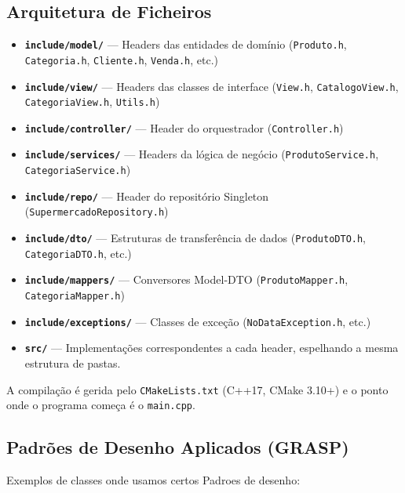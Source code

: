 \documentclass[a4paper]{llncs}
\begin{document}
\subsection{Arquitetura de Ficheiros}

\begin{itemize}
    \item \textbf{\texttt{include/model/}} — Headers das entidades de domínio (\texttt{Produto.h}, \texttt{Categoria.h}, \texttt{Cliente.h}, \texttt{Venda.h}, etc.)
    \item \textbf{\texttt{include/view/}} — Headers das classes de interface (\texttt{View.h}, \texttt{CatalogoView.h}, \texttt{CategoriaView.h}, \texttt{Utils.h})
    \item \textbf{\texttt{include/controller/}} — Header do orquestrador (\texttt{Controller.h})
    \item \textbf{\texttt{include/services/}} — Headers da lógica de negócio (\texttt{ProdutoService.h}, \texttt{CategoriaService.h})
    \item \textbf{\texttt{include/repo/}} — Header do repositório Singleton (\texttt{SupermercadoRepository.h})
    \item \textbf{\texttt{include/dto/}} — Estruturas de transferência de dados (\texttt{ProdutoDTO.h}, \texttt{CategoriaDTO.h}, etc.)
    \item \textbf{\texttt{include/mappers/}} — Conversores Model-DTO (\texttt{ProdutoMapper.h}, \texttt{CategoriaMapper.h})
    \item \textbf{\texttt{include/exceptions/}} — Classes de exceção (\texttt{NoDataException.h}, etc.)
    \item \textbf{\texttt{src/}} — Implementações correspondentes a cada header, espelhando a mesma estrutura de pastas.
\end{itemize}

A compilação é gerida pelo \texttt{CMakeLists.txt} (C++17, CMake 3.10+) e o ponto onde o programa começa é o \texttt{main.cpp}.

\subsection{Padrões de Desenho Aplicados (GRASP)}
Exemplos de classes onde usamos certos Padroes de desenho:
\end{document}
